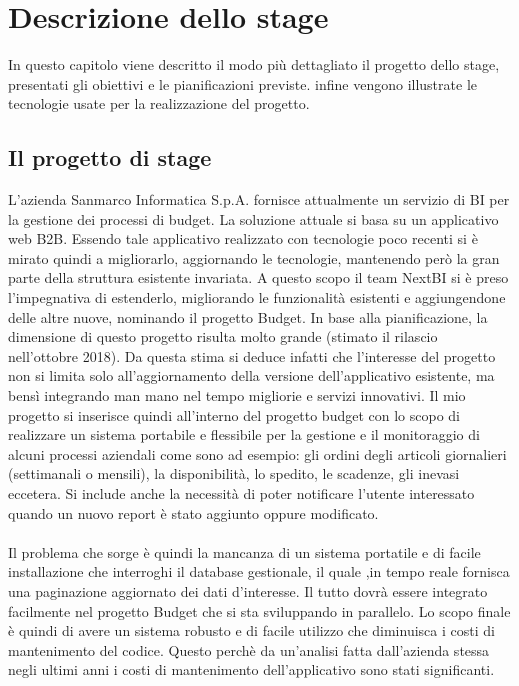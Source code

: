 
\chapter{Descrizione dello stage}
\label{cap:processi-metodologie}

In questo capitolo viene descritto il modo più dettagliato il progetto dello stage, presentati gli obiettivi e le pianificazioni previste. infine vengono illustrate le tecnologie usate per la realizzazione del progetto. 

\section{Il progetto di stage}

L'azienda Sanmarco Informatica S.p.A. fornisce attualmente un servizio di BI per la gestione dei processi di budget. La soluzione attuale si basa su un applicativo web \gls{B2B}. Essendo tale applicativo realizzato con tecnologie poco recenti si è mirato quindi a migliorarlo, aggiornando le tecnologie, mantenendo però la gran parte della struttura esistente invariata.  A questo scopo il team NextBI si è preso l'impegnativa di estenderlo, migliorando le funzionalità esistenti e aggiungendone delle altre nuove, nominando il progetto Budget. In base alla pianificazione, la dimensione di questo progetto risulta molto grande (stimato il rilascio nell'ottobre 2018). Da questa stima si deduce infatti che l'interesse del progetto non si limita solo all'aggiornamento della versione dell'applicativo esistente, ma bensì integrando man mano nel tempo migliorie e servizi innovativi. Il mio progetto si inserisce quindi all'interno del progetto budget con lo scopo di realizzare un sistema portabile e flessibile per la gestione e il monitoraggio di alcuni processi aziendali come sono ad esempio: gli ordini degli articoli giornalieri (settimanali o mensili), la disponibilità, lo spedito, le scadenze, gli inevasi eccetera. Si include anche la necessità di poter notificare l'utente interessato quando un nuovo report è stato aggiunto oppure modificato. 
\\ \\
Il problema che sorge è quindi la mancanza di un sistema portatile e di facile installazione che interroghi il database gestionale, il quale ,in tempo reale fornisca una paginazione aggiornato dei dati d'interesse. Il tutto dovrà essere integrato facilmente nel progetto Budget che si sta sviluppando in parallelo. Lo scopo finale è quindi di avere un sistema robusto e di facile utilizzo che diminuisca i costi di mantenimento del codice. Questo perchè da un'analisi fatta dall'azienda stessa negli ultimi anni i costi di mantenimento dell'applicativo sono  stati significanti.

